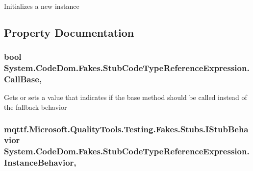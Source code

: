 Initializes a new instance



\subsection{Property Documentation}
\hypertarget{class_system_1_1_code_dom_1_1_fakes_1_1_stub_code_type_reference_expression_a7072e92781086a653dcf18173c862e05}{
\subsubsection[{Call\-Base}]{\setlength{\rightskip}{0pt plus 5cm}bool System.\-Code\-Dom.\-Fakes.\-Stub\-Code\-Type\-Reference\-Expression.\-Call\-Base\hspace{0.3cm}{\ttfamily [get]}, {\ttfamily [set]}}}\label{class_system_1_1_code_dom_1_1_fakes_1_1_stub_code_type_reference_expression_a7072e92781086a653dcf18173c862e05}


Gets or sets a value that indicates if the base method should be called instead of the fallback behavior

\hypertarget{class_system_1_1_code_dom_1_1_fakes_1_1_stub_code_type_reference_expression_af25b5e7f1039dbc2950087381861e7d4}{
\subsubsection[{Instance\-Behavior}]{\setlength{\rightskip}{0pt plus 5cm}mqttf.\-Microsoft.\-Quality\-Tools.\-Testing.\-Fakes.\-Stubs.\-I\-Stub\-Behavior System.\-Code\-Dom.\-Fakes.\-Stub\-Code\-Type\-Reference\-Expression.\-Instance\-Behavior\hspace{0.3cm}{\ttfamily [get]}, {\ttfamily [set]}}}\label{class_system_1_1_code_dom_1_1_fakes_1_1_stub_code_type_reference_expression_af25b5e7f1039dbc2950087381861e7d4}


